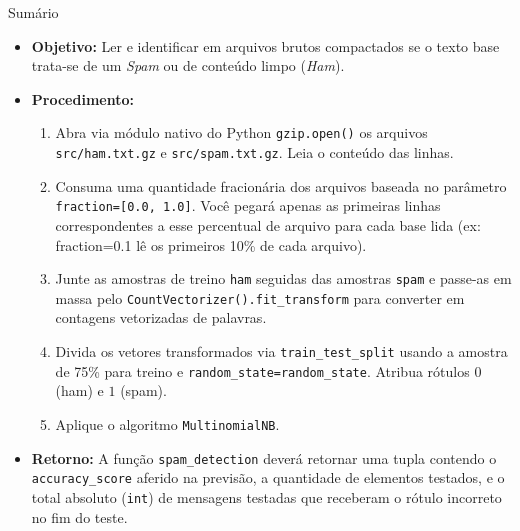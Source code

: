 \documentclass[11pt,a4paper]{article}
\begin{document}
\begin{exercicio}{Sumário}
\begin{itemize}
    \item \textbf{Objetivo:} Ler e identificar em arquivos brutos compactados se o texto base trata-se de um \emph{Spam} ou de conteúdo limpo (\emph{Ham}).
    \item \textbf{Procedimento:}
    \begin{enumerate}
        \item Abra via módulo nativo do Python \texttt{gzip.open()} os arquivos \texttt{src/ham.txt.gz} e \texttt{src/spam.txt.gz}. Leia o conteúdo das linhas.
        \item Consuma uma quantidade fracionária dos arquivos baseada no parâmetro \texttt{fraction=[0.0, 1.0]}. Você pegará apenas as primeiras linhas correspondentes a esse percentual de arquivo para cada base lida (ex: fraction=0.1 lê os primeiros 10\% de cada arquivo).
        \item Junte as amostras de treino \texttt{ham} seguidas das amostras \texttt{spam} e passe-as em massa pelo \texttt{CountVectorizer().fit\_transform} para converter em contagens vetorizadas de palavras.
        \item Divida os vetores transformados via \texttt{train\_test\_split} usando a amostra de 75\% para treino e \texttt{random\_state=random\_state}. Atribua rótulos $0$ (ham) e $1$ (spam).
        \item Aplique o algoritmo \texttt{MultinomialNB}.
    \end{enumerate}
    \item \textbf{Retorno:} A função \texttt{spam\_detection} deverá retornar uma tupla contendo o \texttt{accuracy\_score} aferido na previsão, a quantidade de elementos testados, e o total absoluto (\texttt{int}) de mensagens testadas que receberam o rótulo incorreto no fim do teste.
\end{itemize}
\end{exercicio}
\end{document}
